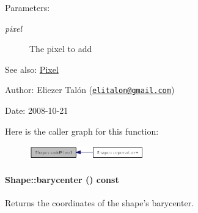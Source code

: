 \begin{Desc}
\item[Parameters:]
\begin{description}
\item[{\em pixel}]The pixel to add\end{description}
\end{Desc}
\begin{Desc}
\item[See also:]\hyperlink{_shape_8hpp_535e59456e3e633842529cfa8ea103c4}{Pixel}\end{Desc}
\begin{Desc}
\item[Author:]Eliezer Talón (\href{mailto:elitalon@gmail.com}{\tt elitalon@gmail.com}) \end{Desc}
\begin{Desc}
\item[Date:]2008-10-21 \end{Desc}


Here is the caller graph for this function:\nopagebreak
\begin{figure}[H]
\begin{center}
\leavevmode
\includegraphics[width=141pt]{class_shape_f6114234203d9473f1fef9e6391f9243_icgraph}
\end{center}
\end{figure}
\hypertarget{class_shape_a935b8870ea61569990b304b77513923}{
\paragraph[{barycenter}]{ Shape::barycenter () const}\hfill}
\label{class_shape_a935b8870ea61569990b304b77513923}


Returns the coordinates of the shape's barycenter. 

